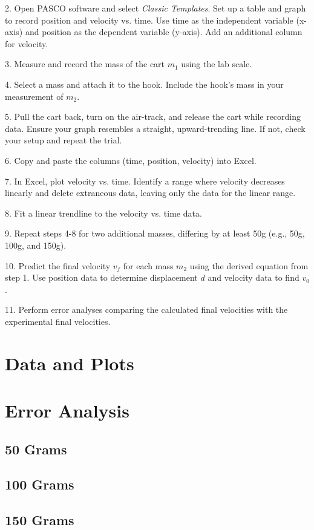 \documentclass[hidelinks, 12pt, letterpaper]{article}
\begin{document}
2. Open PASCO software and select \textit{Classic Templates}. Set up a table and graph to record position and velocity vs. time. Use time as the independent variable (x-axis) and position as the dependent variable (y-axis). Add an additional column for velocity.

3. Measure and record the mass of the cart $m_1$ using the lab scale.

4. Select a mass and attach it to the hook. Include the hook's mass in your measurement of $m_2$.

5. Pull the cart back, turn on the air-track, and release the cart while recording data. Ensure your graph resembles a straight, upward-trending line. If not, check your setup and repeat the trial.

6. Copy and paste the columns (time, position, velocity) into Excel.

7. In Excel, plot velocity vs. time. Identify a range where velocity decreases linearly and delete extraneous data, leaving only the data for the linear range.

8. Fit a linear trendline to the velocity vs. time data.

9. Repeat steps 4-8 for two additional masses, differing by at least 50g (e.g., 50g, 100g, and 150g).

10. Predict the final velocity $v_f$ for each mass $m_2$ using the derived equation from step 1. Use position data to determine displacement $d$ and velocity data to find $v_0$.

11. Perform error analyses comparing the calculated final velocities with the experimental final velocities.

\section{Data and Plots}

\section{Error Analysis}
\subsection{50 Grams}
\subsection{100 Grams}
\subsection{150 Grams}
\end{document}
